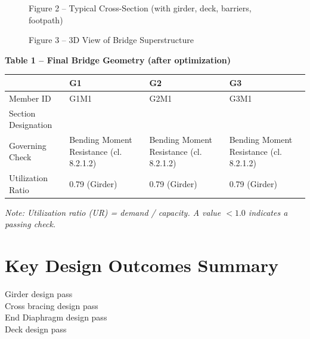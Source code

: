 \documentclass[12pt,a4paper]{report}
\numberwithin{table}{chapter}
\numberwithin{figure}{chapter}
\begin{document}
\newpage

\begin{figure}[H]
\centering
{}
\caption*{Figure 2 -- Typical Cross-Section (with girder, deck, barriers, footpath)}
\end{figure}

\begin{figure}[H]
\centering
{}
\caption*{Figure 3 -- 3D View of Bridge Superstructure}
\end{figure}

\noindent\textbf{Table 1 -- Final Bridge Geometry (after optimization)}

\vspace{0.4em}
\noindent
\begin{tabular}{|C{2.8cm}|C{4.1cm}|C{4.1cm}|C{4.1cm}|}
\hline
  \textbf{} &
  \textbf{G1} &
  \textbf{G2} &
  \textbf{G3} \\
\hline
Member ID & G1M1 & G2M1 & G3M1 \\
\hline
Section Designation &  &  &  \\
\hline
Governing Check & Bending Moment Resistance (cl. 8.2.1.2) & Bending Moment Resistance (cl. 8.2.1.2) & Bending Moment Resistance (cl. 8.2.1.2) \\
\hline
Utilization Ratio & 0.79 (Girder) & 0.79 (Girder) & 0.79 (Girder) \\
\hline
\end{tabular}

\vspace{0.4em}
\noindent\textit{Note: Utilization ratio (UR) = demand / capacity. A value $< 1.0$ indicates a passing check.}

\vspace{1em}

\section*{Key Design Outcomes Summary}
\label{sec:key-outcomes}

\noindent Girder design pass \\
Cross bracing design pass \\
End Diaphragm design pass \\
Deck design pass
\end{document}

